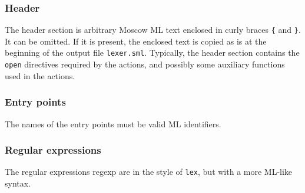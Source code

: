 \documentclass[fleqn]{article}
\begin{document}
\subsubsection{Header}

The header section is arbitrary Moscow ML text enclosed in curly
braces \verb#{# and \verb#}#.  It can be omitted.  If it is present,
the enclosed text is copied as is at the beginning of the output file
{\tt lexer.sml}.  Typically, the header section contains the {\tt
  open} directives required by the actions, and possibly some
auxiliary functions used in the actions.

\subsubsection{Entry points}

The names of the entry points must be valid ML identifiers.

\subsubsection{Regular expressions}

The regular expressions regexp are in the style of {\tt lex}, but with
a more ML-like syntax.
\end{document}
